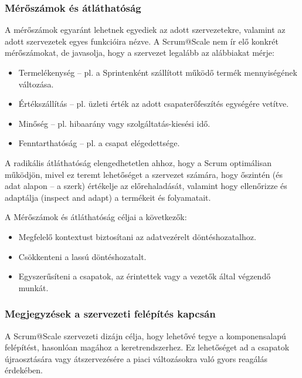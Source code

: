 \documentclass[12pt,a4paper,parskip=full]{scrartcl}
\begin{document}
\subsubsection{Mérőszámok és átláthatóság}\label{Metrics-and-transparency}

A mérőszámok egyaránt lehetnek egyediek az adott szervezetekre, valamint az adott szervezetek egyes funkcióira nézve. A Scrum@Scale nem ír elő konkrét mérőszámokat, de javasolja, hogy a szervezet legalább az alábbiakat mérje:

\begin{itemize}
\itemsep1pt\parskip0pt
\item
 Termelékenység – pl. a Sprintenként szállított működő termék mennyiségének változása.
\item
 Értékszállítás – pl. üzleti érték az adott csapaterőfeszítés egységére vetítve.
\item
 Minőség – pl. hibaarány vagy szolgáltatás-kiesési idő.
\item
 Fenntarthatóság – pl. a csapat elégedettsége.
\end{itemize}

A radikális átláthatóság elengedhetetlen ahhoz, hogy a Scrum optimálisan működjön, mivel ez teremt lehetőséget a szervezet számára, hogy őszintén (és adat alapon – a szerk) értékelje az előrehaladását, valamint hogy ellenőrizze és adaptálja (inspect and adapt) a termékeit és folyamatait.

A Mérőszámok és átláthatóság céljai a következők:

\begin{itemize}
\itemsep1pt\parskip0pt
\item
 Megfelelő kontextust biztosítani az adatvezérelt döntéshozatalhoz.
\item
 Csökkenteni a lassú döntéshozatalt.
\item
 Egyszerűsíteni a csapatok, az érintettek vagy a vezetők által végzendő munkát.
\end{itemize}

\subsubsection{Megjegyzések a szervezeti felépítés kapcsán}\label{some-notes-on-organizational-design}

A Scrum@Scale szervezeti dizájn célja, hogy lehetővé tegye a komponensalapú felépítést, hasonlóan magához a keretrendszerhez. Ez lehetőséget ad a csapatok újraosztására vagy átszervezésére a piaci változásokra való gyors reagálás érdekében.
 
\end{document}
